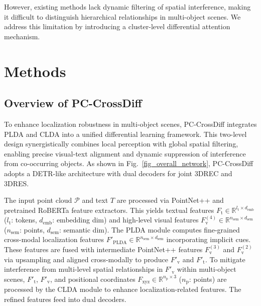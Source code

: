 \documentclass[letterpaper]{article} %
\begin{document}
However, existing methods lack dynamic filtering of spatial interference, making it difficult to distinguish hierarchical relationships in multi-object scenes. We address this limitation by introducing a cluster-level differential attention mechanism.




\section{Methods}

\subsection{Overview of PC-CrossDiff}
\label{sec:overview}

To enhance localization robustness in multi-object scenes, PC-CrossDiff integrates PLDA and CLDA into a unified differential learning framework. This two-level design synergistically combines local perception with global spatial filtering, enabling precise visual-text alignment and dynamic suppression of interference from co-occurring objects. As shown in Fig.~\ref{fig_overall_network}, PC-CrossDiff adopts a DETR-like architecture with dual decoders for joint 3DREC and 3DRES.


The input point cloud $\mathcal{P}$ and text $T$ are processed via PointNet++ \cite{qiPointNetDeepHierarchical2017a} and pretrained RoBERTa \cite{liuRoBERTaRobustlyOptimized2019} feature extractors. This yields textual features $F_{\text{t}} \in \mathbb{R}^{l_{\text{t}} \times d_{\text{emb}}}$ ($l_{\text{t}}$: tokens, $d_{\text{emb}}$: embedding dim) and high-level visual features $F_{\text{v}}^{(4)} \in \mathbb{R}^{n_{\mathrm{sem}} \times d_{\mathrm{sem}}}$ ($n_{\mathrm{sem}}$: points, $d_{\mathrm{sem}}$: semantic dim). The PLDA module computes fine-grained cross-modal localization features $F'_{\text{PLDA}} \in \mathbb{R}^{n_{\mathrm{sem}} \times d_{\mathrm{sem}}}$ incorporating implicit cues. These features are fused with intermediate PointNet++ features $F_{\text{v}}^{(3)}$ and $F_{\text{v}}^{(2)}$ via upsampling and aligned cross-modally to produce $F'_{\text{v}}$ and $F'_{\text{t}}$. To mitigate interference from multi-level spatial relationships in $F'_{\text{v}}$ within multi-object scenes, $F'_{\text{t}}$, $F'_{\text{v}}$, and positional coordinates $F_{\mathrm{xyz}} \in \mathbb{R}^{n_{\mathrm{p}} \times 3}$ ($n_{\mathrm{p}}$: points) are processed by the CLDA module to enhance localization-related features. The refined features feed into dual decoders.
\end{document}
